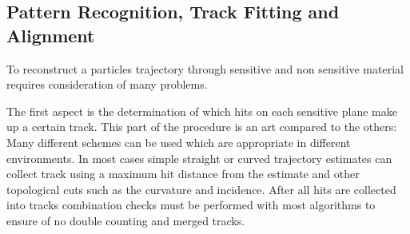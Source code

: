 \subsection{Pattern Recognition, Track Fitting and Alignment}
\label{patTraAli}
To reconstruct a particles trajectory through sensitive and non sensitive material requires consideration of many problems.  

The first aspect is the determination of which hits on each sensitive plane make up a certain track. This part of the procedure is an art compared to the others: Many different schemes can be used which are appropriate in different environments. In most cases simple straight or curved trajectory estimates can collect track using a maximum hit distance from the estimate and other topological cuts such as the curvature and incidence. After all hits are collected into tracks combination checks must be performed with most algorithms to ensure of no double counting and merged tracks.     

